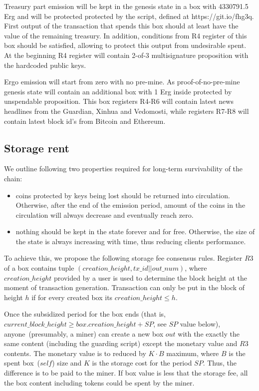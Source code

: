 Treasury part emission will be kept in the genesis state in a box with 4330791.5 Erg and
will be protected protected by the script, defined at https://git.io/fhg3q.
First output of the transaction that spends this box should at least have the value of the
remaining treasury.
In addition, conditions from R4 register of this box should be satisfied,
allowing to protect this output from undesirable spent.
At the beginning R4 register will contain 2-of-3
multisignature proposition with the hardcoded public keys.

Ergo emission will start from zero with no pre-mine. As proof-of-no-pre-mine genesis state
will contain an additional box with 1 Erg inside protected by unspendable proposition.
This box registers R4-R6 will contain latest news headlines from the Guardian, Xinhua and Vedomosti,
while registers R7-R8 will contain latest block id's from Bitcoin and Ethereum.

\subsection{Storage rent}

We outline following two properties required for long-term survivability of the chain:

\begin{itemize}
    \item{} coins protected by keys being lost should be returned into circulation.
    Otherwise, after the end of the emission period, amount of the coins
    in the circulation will always decrease and eventually reach zero.
    \item{} nothing should be kept in the state forever and for free.
    Otherwise, the size of the state is always increasing with time, thus reducing clients performance.
\end{itemize}

To achieve this, we propose the following storage fee consensus rules.
Register $R3$ of a box contains tuple $(creation\_height, tx\_id || out\_num)$, where $creation\_height$ provided by a user
is used to determine the block height at the moment of transaction generation.
Transaction can only be put in the block of height $h$ if for every created box its $creation\_height \le h$.

Once the subsidized period for the box ends (that is,
$current\_block\_height \ge box.creation\_height + SP$, see $SP$ value below), anyone~(presumably, a miner) can
create a new box $out$ with the exactly the same content (including the guarding
script) except the monetary value and $R3$ contents. The monetary value is to
reduced by $K \cdot B$ maximum, where $B$ is the spent box~($self$)
size and $K$ is the storage cost for the period $SP$. Thus, the difference is to be paid to the miner.
If box value is less that the storage fee, all the box content including tokens could be spent by the miner.


